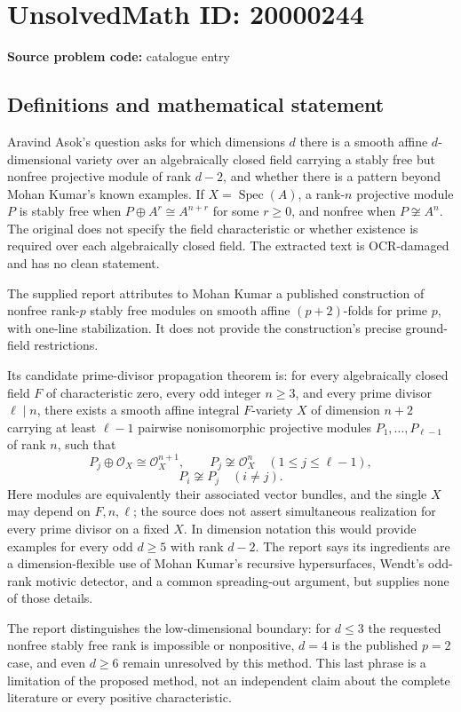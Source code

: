 \documentclass[11pt]{article}
\begin{document}
\section*{UnsolvedMath ID: 20000244}
\textbf{Source problem code:} catalogue entry
\subsection{Definitions and mathematical statement}
Aravind Asok's question asks for which dimensions \(d\) there is a smooth affine \(d\)-dimensional variety over an algebraically closed field carrying a stably free but nonfree projective module of rank \(d-2\), and whether there is a pattern beyond Mohan Kumar's known examples. If \(X=\operatorname{Spec}(A)\), a rank-\(n\) projective module \(P\) is stably free when \(P\oplus A^r\cong A^{n+r}\) for some \(r\geq0\), and nonfree when \(P\not\cong A^n\). The original does not specify the field characteristic or whether existence is required over each algebraically closed field. The extracted text is OCR-damaged and has no clean statement.

The supplied report attributes to Mohan Kumar a published construction of nonfree rank-\(p\) stably free modules on smooth affine \((p+2)\)-folds for prime \(p\), with one-line stabilization. It does not provide the construction's precise ground-field restrictions.

Its candidate prime-divisor propagation theorem is: for every algebraically closed field \(F\) of characteristic zero, every odd integer \(n\geq3\), and every prime divisor \(\ell\mid n\), there exists a smooth affine integral \(F\)-variety \(X\) of dimension \(n+2\) carrying at least \(\ell-1\) pairwise nonisomorphic projective modules \(P_1,\ldots,P_{\ell-1}\) of rank \(n\), such that
\[
P_j\oplus\mathcal O_X\cong\mathcal O_X^{n+1},\qquad
P_j\not\cong\mathcal O_X^n\quad(1\leq j\leq\ell-1),
\]
\[
P_i\not\cong P_j\quad(i\ne j).
\]
Here modules are equivalently their associated vector bundles, and the single \(X\) may depend on \(F,n,\ell\); the source does not assert simultaneous realization for every prime divisor on a fixed \(X\). In dimension notation this would provide examples for every odd \(d\geq5\) with rank \(d-2\). The report says its ingredients are a dimension-flexible use of Mohan Kumar's recursive hypersurfaces, Wendt's odd-rank motivic detector, and a common spreading-out argument, but supplies none of those details.

The report distinguishes the low-dimensional boundary: for \(d\leq3\) the requested nonfree stably free rank is impossible or nonpositive, \(d=4\) is the published \(p=2\) case, and even \(d\geq6\) remain unresolved by this method. This last phrase is a limitation of the proposed method, not an independent claim about the complete literature or every positive characteristic.
\end{document}
